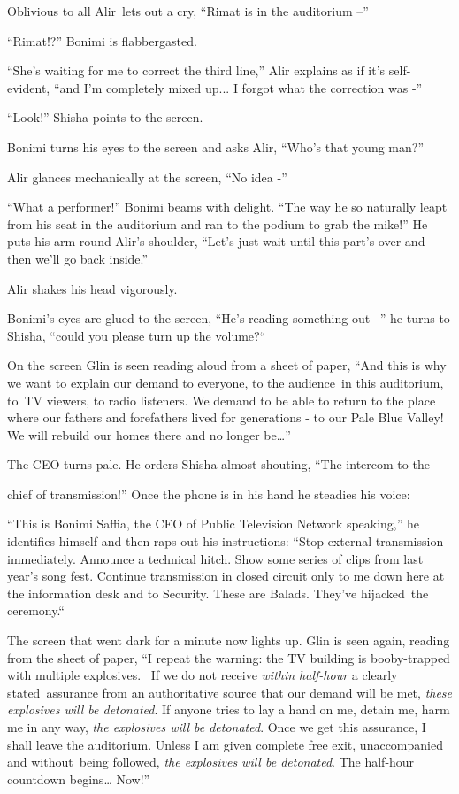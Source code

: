 \documentclass[twoside,11pt]{book}
\begin{document}
Oblivious to all Alir~lets out a cry, ``Rimat is in the auditorium --'' 

``Rimat!?'' Bonimi is flabbergasted. \ 

``She's waiting for me to correct the third line,'' Alir explains as if it's self-evident,
``and I'm completely mixed up... I forgot what the correction was -''

``Look!'' Shisha points to the screen.

Bonimi turns his eyes to the screen and asks Alir, ``Who's that young man?'' 

Alir glances mechanically at the screen, ``No idea -''

``What a performer!'' Bonimi beams with delight. ``The way he so naturally leapt
from his seat in the auditorium and ran to the podium to grab the mike!'' He puts his arm round Alir's
shoulder, ``Let's just wait until this part's over and then we'll go back inside.'' 

Alir shakes his head vigorously.\ 

Bonimi's eyes are glued to the screen, ``He's reading something out --'' he turns to Shisha,
``could you please turn up the volume?``\ 

On the screen Glin is seen reading aloud from a sheet of paper, ``And this is why we want to explain our
demand to everyone, to the audience~in this auditorium, to~TV viewers, to radio listeners. We demand to be able to
return to the place where our fathers and forefathers lived for generations - to our Pale Blue Valley! We will rebuild
our homes there and no longer be{\dots}''

The CEO turns pale. He orders Shisha almost shouting, ``The intercom to the 

chief of transmission!'' Once the phone is in his hand he steadies his voice:

``This is Bonimi Saffia, the CEO of Public Television Network speaking,'' he identifies
himself and then raps out his instructions: ``Stop external transmission immediately. Announce a technical
hitch. Show some series of clips from last year's song fest. Continue transmission in closed circuit only to me down
here at the information desk and to Security. These are Balads. They've hijacked~the ceremony.``~~~~~~ 

The screen that went dark for a minute now lights up. Glin is seen again, reading from the sheet of paper,
``I repeat the warning: the TV building is booby-trapped with multiple explosives. \ If we do not receive
\textit{within half-hour} a clearly stated~assurance from an authoritative source that our demand will be met,
\textit{these explosives will be detonated}. If anyone tries to lay a hand on me, detain me, harm me in any way,
\textit{the explosives will be detonated}. Once we get this assurance, I shall leave the auditorium. Unless I am given
complete free exit, unaccompanied and without{\ }being followed, \textit{the
explosives will be detonated}. The half-hour countdown begins{\dots} Now!''
\end{document}
